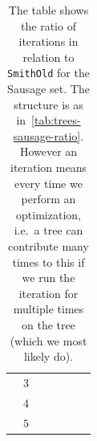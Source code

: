 \begin{table}[htbp]
{\begin{tabular}{ccccccc}
     & $3$ &        &        &        &        &        \\
     & $4$ &        &        &        &        &        \\
     & $5$ &        &        &        &        &        \\
\bottomrule
\end{tabular}
}
  \caption[Iteration ratio for Sausage]{The table shows the ratio of iterations
     in relation to \texttt{SmithOld} for the Sausage set. The structure is as
     in~\cref{tab:trees-sausage-ratio}. However an iteration means every time we
     perform an optimization, i.e.\ a tree can contribute many times to this if
     we run the iteration for multiple times on the tree (which we most likely
     do).\label{tab:iterations-sausage-ratio}}
\end{table}
%

